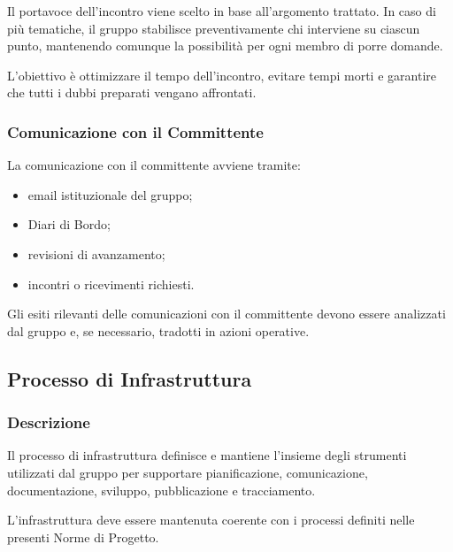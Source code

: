 Il portavoce dell'incontro viene scelto in base all'argomento trattato. In caso di
più tematiche, il gruppo stabilisce preventivamente chi interviene su ciascun
punto, mantenendo comunque la possibilità per ogni membro di porre domande.

L'obiettivo è ottimizzare il tempo dell'incontro, evitare tempi morti e garantire
che tutti i dubbi preparati vengano affrontati.


\subsubsection{Comunicazione con il Committente}

La comunicazione con il committente avviene tramite:

\begin{itemize}
    \item email istituzionale del gruppo;
    \item Diari di Bordo;
    \item revisioni di avanzamento;
    \item incontri o ricevimenti richiesti.
\end{itemize}

Gli esiti rilevanti delle comunicazioni con il committente devono essere analizzati
dal gruppo e, se necessario, tradotti in azioni operative.


\subsection{Processo di Infrastruttura}
\label{sec:infrastruttura}

\subsubsection{Descrizione}

Il processo di infrastruttura definisce e mantiene l'insieme degli strumenti
utilizzati dal gruppo per supportare pianificazione, comunicazione, documentazione,
sviluppo, pubblicazione e tracciamento.

L'infrastruttura deve essere mantenuta coerente con i processi definiti nelle
presenti Norme di Progetto.

